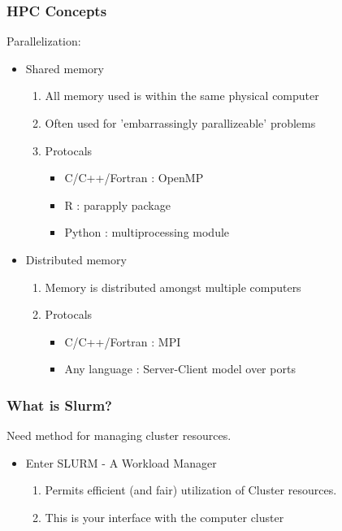 \documentclass{beamer}
\begin{document}
\begin{frame}
\frametitle{HPC Concepts}
Parallelization:
\begin{itemize}
    \item Shared memory
        \begin{enumerate}
            \item All memory used is within the same physical computer
            \pause
            \item Often used for 'embarrassingly parallizeable' problems
            \pause 
            \item Protocals 
                \begin{itemize}
                    \item C/C++/Fortran : OpenMP
                    \item R : parapply package
                    \item Python : multiprocessing module
                \end{itemize}
        \end{enumerate}
    
    \pause
    \bigskip
    \item Distributed memory
        \begin{enumerate}
            \item Memory is distributed amongst multiple computers
            \pause
            \item Protocals 
                \begin{itemize}
                    \item C/C++/Fortran : MPI
                    \item Any language : Server-Client model over ports
                \end{itemize}
        \end{enumerate}
\end{itemize}
\end{frame}
 


\begin{frame}
\frametitle{What is Slurm?}
Need method for managing cluster resources.
\bigskip
\begin{itemize}
    \pause
    \item Enter SLURM - A Workload Manager
    \bigskip
    \pause
    \begin{enumerate}
        \item Permits efficient (and fair) utilization of Cluster resources.
        \pause
        \bigskip
        \item This is your interface with the computer cluster
    \end{enumerate}
\end{itemize}
\end{frame}
\end{document}
